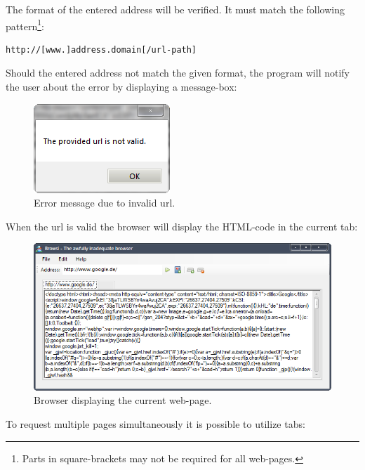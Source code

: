 The format of the entered address will be verified. It must match the following pattern\footnote{Parts in square-brackets may not be required for all web-pages.}:

\begin{lstlisting}[language=xml]
http://[www.]address.domain[/url-path]
\end{lstlisting}

Should the entered address not match the given format, the program will notify the user about the error by displaying a message-box:

\begin{figure}[H]
\begin{center}
\includegraphics[scale=1]{gfx/error_message.png}
\caption{Error message due to invalid url.}
\label{fig:error_message}
\end{center}
\end{figure}

When the url is valid the browser will display the \ac{HTML}-code in the current tab:

\begin{figure}[H]
\begin{center}
\includegraphics[width=\textwidth]{gfx/display_page.png}
\caption{Browser displaying the current web-page.}
\label{fig:display_page}
\end{center}
\end{figure}

To request multiple pages simultaneously it is possible to utilize tabs:

